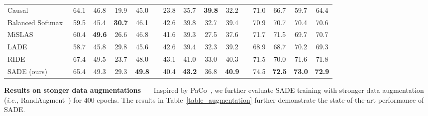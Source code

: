 \documentclass{article}
\def\ie{\emph{i.e.}} \def\Ie{\emph{I.e.}}
\def\ie{\emph{i.e., }}
\begin{document}
\begin{table*}[h]
\begin{center}
\begin{threeparttable}
{\begin{tabular}{lcccccccccccccc}
        Causal~\cite{tang2020long}  & 64.1& 46.8& 19.9& 45.0  &&   23.8 & 35.7 & \textbf{39.8} & 32.2 &&  71.0 & 66.7 & 59.7 & 64.4 \\
        Balanced Softmax~\cite{jiawei2020balanced}    & 59.5 & 45.4 & \textbf{30.7} & 46.1 &&42.6 & 39.8& 32.7&39.4 &&  70.9 & 70.7 & 70.4 & 70.6    \\
       
        MiSLAS~\cite{zhong2021improving}   & 60.4 & \textbf{49.6} & 26.6 & 46.8&&   41.6 & 39.3 & 27.5 & 37.6 &&  71.7 & 71.5 & 69.7 & 70.7 \\ 
        LADE~\cite{hong2020disentangling} &  58.7 & 45.8& 29.8& 45.6 && 42.6 & 39.4 & 32.3 & 39.2 && 68.9 & 68.7 & 70.2 &69.3 \\
        RIDE~\cite{wang2020long} & 67.4 & 49.5 & 23.7 & 48.0 &&   43.1 & 41.0 & 33.0 & 40.3 && 71.5 & 70.0 & 71.6 & 71.8 \\\midrule
          SADE (ours)   & 65.4 & 49.3  & 29.3 & \textbf{49.8} && 40.4 & \textbf{43.2} &36.8 & \textbf{40.9} && 74.5 & \textbf{72.5} & \textbf{73.0} & \textbf{72.9} \\ 
        \bottomrule

	\end{tabular}}
	 \end{threeparttable} 
	 \end{center}


      \vspace{0.1in}
\end{table*} 



\textbf{Results on stonger data augmentations}~~~  Inspired by PaCo~\cite{cui2021parametric}, we further evaluate SADE training with stronger data augmentation  (\ie RandAugment~\cite{cubuk2020randaugment}) for 400   epochs. The results in Table~\ref{table_augmentation} further demonstrate the state-of-the-art performance of SADE.
\end{document}
